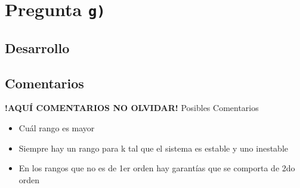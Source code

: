 \section{Pregunta \texttt{g)}}\label{pregunta-g}

\subsection{Desarrollo}

\FloatBarrier
\subsection{Comentarios}


\textbf{!AQUÍ COMENTARIOS NO OLVIDAR!}
Posibles Comentarios
\begin{itemize}
    \item Cuál rango es mayor
    \item Siempre hay un rango para k tal que el sistema es estable y uno inestable
    \item En los rangos que no es de 1er orden hay garantías que se comporta de 2do orden
\end{itemize}